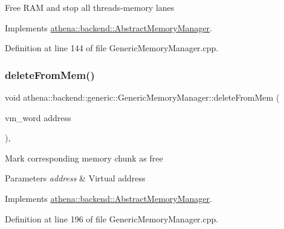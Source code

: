 Free R\+AM and stop all threads-\/memory lanes 

Implements \mbox{\hyperlink{classathena_1_1backend_1_1_abstract_memory_manager}{athena\+::backend\+::\+Abstract\+Memory\+Manager}}.



Definition at line 144 of file Generic\+Memory\+Manager.\+cpp.

\mbox{\label{classathena_1_1backend_1_1generic_1_1_generic_memory_manager_a2767b6c1f5887a2928b665e0c1b454c7}} 
\subsubsection{\texorpdfstring{delete\+From\+Mem()}{deleteFromMem()}}
{\footnotesize\ttfamily void athena\+::backend\+::generic\+::\+Generic\+Memory\+Manager\+::delete\+From\+Mem (\begin{DoxyParamCaption}\item[{vm\+\_\+word}]{address }\end{DoxyParamCaption})\hspace{0.3cm}{\ttfamily [override]}, {\ttfamily [virtual]}}

Mark corresponding memory chunk as free 
\begin{DoxyParams}{Parameters}
{\em address} & Virtual address \\
\hline
\end{DoxyParams}


Implements \mbox{\hyperlink{classathena_1_1backend_1_1_abstract_memory_manager_a8ffd6cf21559978f394e2e11815506b5}{athena\+::backend\+::\+Abstract\+Memory\+Manager}}.



Definition at line 196 of file Generic\+Memory\+Manager.\+cpp.

\mbox{\label{classathena_1_1backend_1_1generic_1_1_generic_memory_manager_a7f3dacb56bd95b837910441d0aef1dd8}} 
